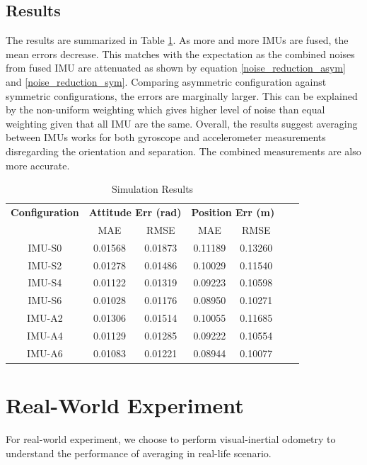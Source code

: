 \documentclass[conference]{IEEEtran}
\begin{document}
\subsection{Results}

The results are summarized in Table \ref{tab:sim_result}. As more and more IMUs are fused, the mean errors decrease. This matches with the expectation as the combined noises from fused IMU are attenuated as shown by equation \ref{noise_reduction_asym} and \ref{noise_reduction_sym}. Comparing asymmetric configuration against symmetric configurations, the errors are marginally larger. This can be explained by the non-uniform weighting which gives higher level of noise than equal weighting given that all IMU are the same. Overall, the results suggest averaging between IMUs works for both gyroscope and accelerometer measurements disregarding the orientation and separation. The combined measurements are also more accurate.

\begin{table}[h!]
\centering
\caption{Simulation Results}
\label{tab:sim_result}
\begin{tabular}{ccccccc}
\toprule
\textbf{Configuration} & \multicolumn{2}{c}{\textbf{Attitude Err (rad)}} & \multicolumn{2}{c}{\textbf{Position Err (m)}} \\
\cmidrule(lr){2-3} \cmidrule(lr){4-5}
& MAE & RMSE & MAE & RMSE \\
\midrule
IMU-S0 & 0.01568 & 0.01873 & 0.11189 & 0.13260 \\
\midrule
IMU-S2 & 0.01278 & 0.01486 & 0.10029 & 0.11540 \\
IMU-S4 & 0.01122 & 0.01319 & 0.09223 & 0.10598 \\
IMU-S6 & 0.01028 & 0.01176 & 0.08950  & 0.10271 \\
\midrule
IMU-A2 & 0.01306 & 0.01514 & 0.10055 & 0.11685 \\
IMU-A4 & 0.01129 & 0.01285 & 0.09222 & 0.10554 \\
IMU-A6 & 0.01083 & 0.01221 & 0.08944 & 0.10077 \\
\bottomrule
\end{tabular}
\end{table}

\section{Real-World Experiment}

For real-world experiment, we choose to perform visual-inertial odometry to understand the performance of averaging in real-life scenario.
\end{document}
